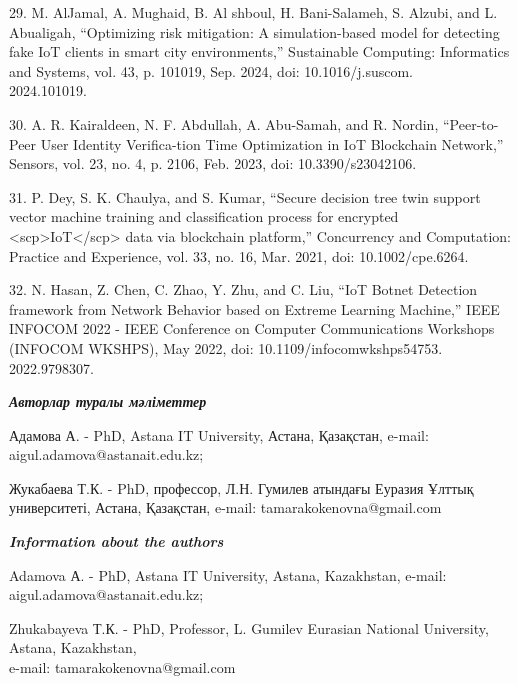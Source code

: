 \begin{noparindent}
29. M. AlJamal, A. Mughaid, B. Al shboul, H. Bani-Salameh, S. Alzubi,
and L. Abualigah, ``Optimizing risk mitigation: A simulation-based model
for detecting fake IoT clients in smart city environments,'' Sustainable
Computing: Informatics and Systems, vol. 43, p. 101019, Sep. 2024, doi:
10.1016/j.suscom.\\2024.101019.

30. A. R. Kairaldeen, N. F. Abdullah, A. Abu-Samah, and R. Nordin,
``Peer-to-Peer User Identity Verifica-tion Time Optimization in IoT
Blockchain Network,'' Sensors, vol. 23, no. 4, p. 2106, Feb. 2023, doi:
10.3390/s23042106.

31. P. Dey, S. K. Chaulya, and S. Kumar, ``Secure decision tree twin
support vector machine training and classification process for encrypted
\textless scp\textgreater IoT\textless/scp\textgreater{} data via
blockchain platform,'' Concurrency and Computation: Practice and
Experience, vol. 33, no. 16, Mar. 2021, doi: 10.1002/cpe.6264.

32. N. Hasan, Z. Chen, C. Zhao, Y. Zhu, and C. Liu, ``IoT Botnet
Detection framework from Network Behavior based on Extreme Learning
Machine,'' IEEE INFOCOM 2022 - IEEE Conference on Computer
Communications Workshops (INFOCOM WKSHPS), May 2022, doi:
10.1109/infocomwkshps54753.\\2022.9798307.
\end{noparindent}

\emph{{\bfseries Авторлар туралы мәліметтер}}
\begin{noparindent}

Адамова А. - PhD, Astana IT University, Астана, Қазақстан, e-mail:
aigul.adamova@astanait.edu.kz;

Жукабаева Т.К. - PhD, профессор, Л.Н. Гумилев атындағы Еуразия Ұлттық
университеті, Астана, Қазақстан, e-mail: tamarakokenovna@gmail.com
\end{noparindent}

\emph{{\bfseries Information about the authors}}
\begin{noparindent}

Adamova А. - PhD, Astana IT University, Astana, Kazakhstan, e-mail:
aigul.adamova@astanait.edu.kz;

Zhukabayeva Т.К. - PhD, Professor, L. Gumilev Eurasian National
University, Astana, Kazakhstan,\\e-mail: tamarakokenovna@gmail.com
\end{noparindent}





